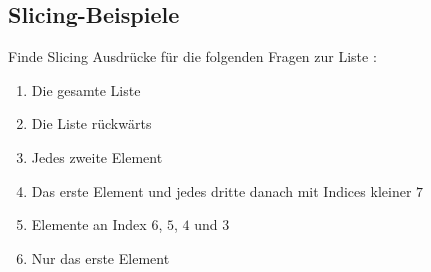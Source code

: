 \subsection{Slicing-Beispiele }

Finde Slicing Ausdrücke für die folgenden Fragen zur Liste :

\begin{enumerate}
    \item Die gesamte Liste
    \item Die Liste rückwärts
    \item Jedes zweite Element
    \item Das erste Element und jedes dritte danach mit Indices kleiner $7$
    \item Elemente an Index $6$, $5$, $4$ und $3$
    \item Nur das erste Element
\end{enumerate}
